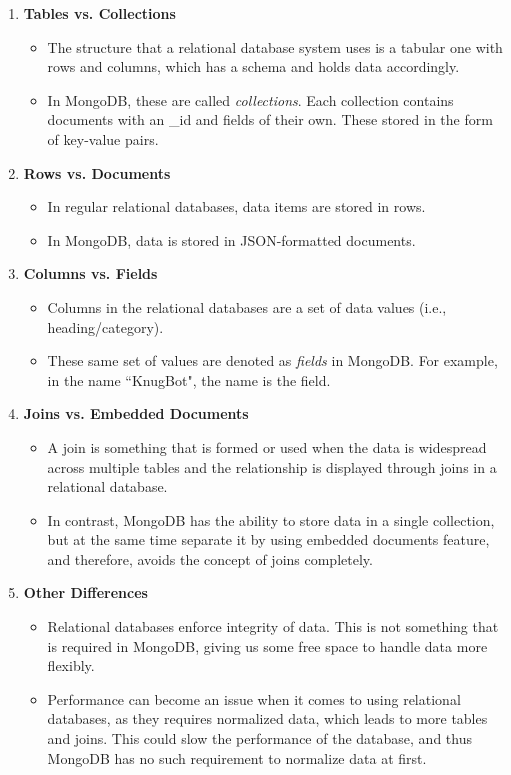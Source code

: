 \documentclass[titlepage, 12pt]{article}
\begin{document}
\begin{enumerate}
    \item \textbf{Tables vs. Collections}
    \begin{itemize}
        \item The structure that a relational database system uses is a tabular one with rows and columns, which has a schema and holds data accordingly.
        \item In MongoDB, these are called \emph{collections}. Each collection contains documents with an \_id and fields of their own. These stored in the form of key-value pairs.
    \end{itemize}
    \item \textbf{Rows vs. Documents}
    \begin{itemize}
        \item In regular relational databases, data items are stored in rows.
        \item In MongoDB, data is stored in JSON-formatted documents.
    \end{itemize}
    \item \textbf{Columns vs. Fields}
    \begin{itemize}
        \item Columns in the relational databases are a set of data values (i.e., heading/category).
        \item These same set of values are denoted as \emph{fields} in MongoDB. For example, in the name ``KnugBot", the name is the field.

    \end{itemize}
    \item \textbf{Joins vs. Embedded Documents}
    \begin{itemize}
        \item A join is something that is formed or used when the data is widespread across multiple tables and the relationship is displayed through joins in a relational database.
        \item In contrast, MongoDB has the ability to store data in a single collection, but at the same time separate it by using embedded documents feature, and therefore, avoids the concept of joins completely.
    \end{itemize}
    \item \textbf{Other Differences}
    \begin{itemize}
        \item Relational databases enforce integrity of data. This is not something that is required in MongoDB, giving us some free space to handle data more flexibly.
        \item Performance can become an issue when it comes to using relational databases, as they requires normalized data, which leads to more tables and joins. This could slow the performance of the database, and thus MongoDB has no such requirement to normalize data at first.

    \end{itemize}
\end{enumerate}
\end{document}
